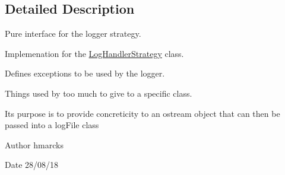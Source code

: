 \subsection{Detailed Description}
Pure interface for the logger strategy. 

Implemenation for the \mbox{\hyperlink{classLoggerClasses_1_1LogHandlerStrategy}{Log\+Handler\+Strategy}} class.

Defines exceptions to be used by the logger.

Things used by too much to give to a specific class.

It\textquotesingle{}s purpose is to provide concreticity to an ostream object that can then be passed into a log\+File class

\begin{DoxyAuthor}{Author}
hmarcks
\end{DoxyAuthor}
\begin{DoxyDate}{Date}
28/08/18 
\end{DoxyDate}
